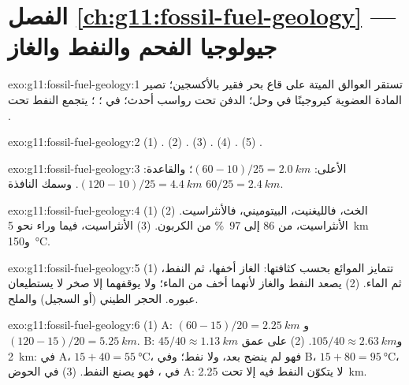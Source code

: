 \section*{الفصل \ref{ch:g11:fossil-fuel-geology} --- جيولوجيا الفحم والنفط والغاز}

\begin{solution}{exo:g11:fossil-fuel-geology:1}
تستقر العوالق الميتة على قاع بحر فقير بالأكسجين؛ تصير المادة العضوية
كيروجينًا في وحل؛ الدفن تحت رواسب أحدث؛  في
؛ ؛ يتجمع النفط تحت .
\end{solution}

\begin{solution}{exo:g11:fossil-fuel-geology:2}
(1) . (2) . (3) . (4) . (5) .
\end{solution}

\begin{solution}{exo:g11:fossil-fuel-geology:3}
الأعلى: $(60 - 10)/25 = \qty{2.0}{km}$؛ والقاعدة: $(120 - 10)/25 = \qty{4.4}{km}$.
وسمك النافذة $60/25 = \qty{2.4}{km}$.
\end{solution}

\begin{solution}{exo:g11:fossil-fuel-geology:4}
(1) الخث، فالليغنيت،  البيتوميني، فالأنثراسيت. (2) الأنثراسيت، من 86 إلى
\qty{97}{\percent} من الكربون. (3) الأنثراسيت، فيما وراء نحو \qty{5}{km}
و\qty{150}{\degreeCelsius}.
\end{solution}

\begin{solution}{exo:g11:fossil-fuel-geology:5}
(1) تتمايز الموائع بحسب كثافتها: الغاز أخفها، ثم النفط،
ثم الماء. (2) يصعد النفط والغاز لأنهما أخف من الماء؛ ولا
يوقفهما إلا صخر لا يستطيعان عبوره. الحجر الطيني (أو السجيل) والملح.
\end{solution}

\begin{solution}{exo:g11:fossil-fuel-geology:6}
(1) A: $(60 - 15)/20 = \qty{2.25}{km}$ و$(120 - 15)/20 = \qty{5.25}{km}$.
B: $45/40 \approx \qty{1.13}{km}$ و$105/40 \approx \qty{2.63}{km}$.
(2) على عمق \qty{2}{km}: في A، $15 + 40 = \qty{55}{\degreeCelsius}$، فهو لم ينضج
بعد، ولا نفط؛ وفي B، $15 + 80 = \qty{95}{\degreeCelsius}$، في ، فهو يصنع النفط. (3) في الحوض A: لا يتكوّن النفط فيه إلا تحت
\qty{2.25}{km}.
\end{solution}

